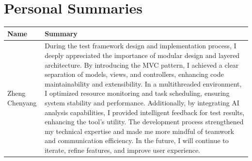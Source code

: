 \documentclass{article}
\begin{document}
\section{Personal Summaries}
\begin{tabular}{|p{50pt}|p{350pt}|}
    \hline
    Name           & Summary                                                                                                                                                                                                                                                                                                                                                                                                                                                                                                                                                                                                                                                                                                                                                                                                                                                                                                                                                                                                                                                                                                                                                                                                                      \\ \hline
    Zheng Chenyang & During the test framework design and implementation process, I deeply appreciated the importance of modular design and layered architecture. By introducing the MVC pattern, I achieved a clear separation of models, views, and controllers, enhancing code maintainability and extensibility. In a multithreaded environment, I optimized resource monitoring and task scheduling, ensuring system stability and performance. Additionally, by integrating AI analysis capabilities, I provided intelligent feedback for test results, enhancing the tool's utility. The development process strengthened my technical expertise and made me more mindful of teamwork and communication efficiency. In the future, I will continue to iterate, refine features, and improve user experience.                                                                                                                                                                                                                                                                                                                                                                                                                               \\ \hline

\end{tabular}
\end{document}
